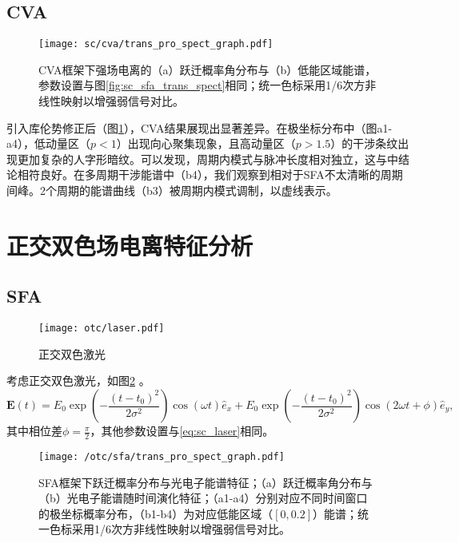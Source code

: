 \subsection{CVA}

\begin{figure}[!htbp]  %
	\centering
	\texttt{[image: sc/cva/trans\_pro\_spect\_graph.pdf]}
	\caption{CVA框架下强场电离的（a）跃迁概率角分布与（b）低能区域能谱，参数设置与图\ref{fig:sc_sfa_trans_spect}相同；统一色标采用1/6次方非线性映射以增强弱信号对比。}
	\label{fig:sc_cva_trans_spect}
\end{figure}

引入库伦势修正后（图\ref{fig:sc_cva_trans_spect}），CVA结果展现出显著差异。在极坐标分布中（图a1-a4），低动量区（$p<1$）出现向心聚集现象，且高动量区（$p>1.5$）的干涉条纹出现更加复杂的人字形暗纹。可以发现，周期内模式与脉冲长度相对独立，这与中结论相符良好。在多周期干涉能谱中（b4），我们观察到相对于SFA不太清晰的周期间峰。2个周期的能谱曲线（b3）被周期内模式调制，以虚线表示。

%
\section{正交双色场电离特征分析}
\subsection{SFA}

\begin{figure}[!htbp]  %
	\centering
	\texttt{[image: otc/laser.pdf]}
	\caption{正交双色激光}
	\label{fig:otc_laser}
\end{figure}

考虑正交双色激光，如图\ref{fig:otc_laser} 。
\begin{equation}
\mathbf{E}(t) = E_0 \exp\left(-\frac{(t - t_0)^2}{2\sigma^2}\right) \cos(\omega t) \hat e_x + E_0 \exp\left(-\frac{(t - t_0)^2}{2\sigma^2}\right) \cos(2 \omega t + \phi) \hat e_y,
\label{eq:otc_laser}
\end{equation}
其中相位差$\phi = \frac{\pi}{2}$，其他参数设置与\ref{eq:sc_laser}相同。

\begin{figure}[!htbp]  %
	\centering
	\texttt{[image: /otc/sfa/trans\_pro\_spect\_graph.pdf]}
	\caption{SFA框架下跃迁概率分布与光电子能谱特征；（a）跃迁概率角分布与（b）光电子能谱随时间演化特征；（a1-a4）分别对应不同时间窗口的极坐标概率分布，（b1-b4）为对应低能区域（$[0, 0.2]$）能谱；统一色标采用1/6次方非线性映射以增强弱信号对比。}
	\label{fig:otc_sfa_trans_spect}
\end{figure}

